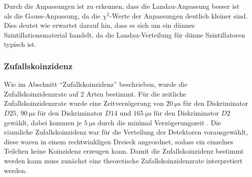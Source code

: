 \documentclass{article}
\begin{document}
Durch die Anpassungen ist zu erkennen, dass die Landau-Anpassung besser ist als die Gauss-Anpassung, da die $\chi^2$-Werte der Anpassungen deutlich kleiner sind.
Dies deutet wie erwartet darauf hin, dass es sich um ein dünnes Szintillationsmaterial handelt, da die Landau-Verteilung für dünne Szintillatoren typisch ist.


\subsubsection*{Zufallskoinzidenz}
Wie im Abschnitt \enquote{Zufallskoinzidenz} beschrieben, wurde die Zufallskoinzidenzrate auf 2 Arten bestimmt.
Für die zeitliche Zufallskoinzidenzrate wurde eine Zeitverzögerung von $\SI{20}{\micro\second}$ für den Diskriminator $D25$, $\SI{90}{\micro\second}$ für den Diskriminator $D14$ und 
$\SI{165}{\micro\second}$ für den Diskriminator $D2$ gewählt, dabei kommen je $\SI{5}{\micro\second}$ durch die minimal Verzögerungszeit \cite{}.
Die räumliche Zufallskoinzidenz war für die Verteilung der Detektoren vorausgewählt, diese waren in einem rechtwinkligen Dreieck angeordnet, sodass ein einzelnes Teilchen keine Koinzidenz erzeugen kann.
Damit die Zufallskoinzidenz bestimmt werden kann muss zunächst eine theoretische Zufallskoinzidenzrate interpretiert werden.
\end{document}
